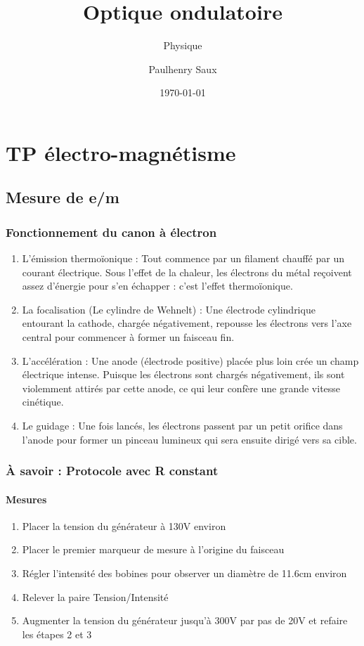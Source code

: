 \documentclass[french]{yLectureNote}
\title{Optique ondulatoire}
\subtitle{Physique}
\author{Paulhenry Saux}
\date{\today}
\begin{document}
\chapter{TP électro-magnétisme}
\section{Mesure de e/m}
\subsection{Fonctionnement du canon à électron}
\begin{enumerate}
 \item L'émission thermoïonique : Tout commence par un filament  chauffé par un courant électrique. Sous l'effet de la chaleur, les électrons du métal reçoivent assez d'énergie pour s'en échapper : c'est l'effet thermoïonique.

\item La focalisation (Le cylindre de Wehnelt) : Une électrode cylindrique entourant la cathode, chargée négativement, repousse les électrons vers l'axe central pour commencer à former un faisceau fin.

\item L'accélération : Une anode (électrode positive) placée plus loin crée un champ électrique intense. Puisque les électrons sont chargés négativement, ils sont violemment attirés par cette anode, ce qui leur confère une grande vitesse cinétique.

\item Le guidage : Une fois lancés, les électrons passent par un petit orifice dans l'anode pour former un pinceau lumineux qui sera ensuite dirigé vers sa cible.
\end{enumerate}
\subsection{À savoir : Protocole avec R constant}
\subsubsection{Mesures}
\begin{enumerate}
 \item Placer la tension du générateur à 130V environ
 \item Placer le premier marqueur de mesure à l'origine du faisceau
 \item Régler l'intensité des bobines pour observer un diamètre de 11.6cm environ
 \item Relever la paire Tension/Intensité
 \item Augmenter la tension du générateur jusqu'à 300V par pas de 20V et refaire les étapes 2 et 3
\end{enumerate}
\end{document}
